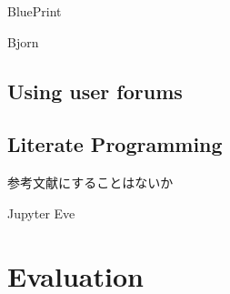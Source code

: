 \documentclass{sigchi}
\begin{document}
BluePrint \cite{Brandt:2010:EPI:1753326.1753402}

Bjorn\cite{Hartmann:2010:OPS:1753326.1753478}



\subsection{Using user forums}


\subsection{Literate Programming}

参考文献にすることはないか

Jupyter
Eve



\section{Evaluation}






\end{document}
